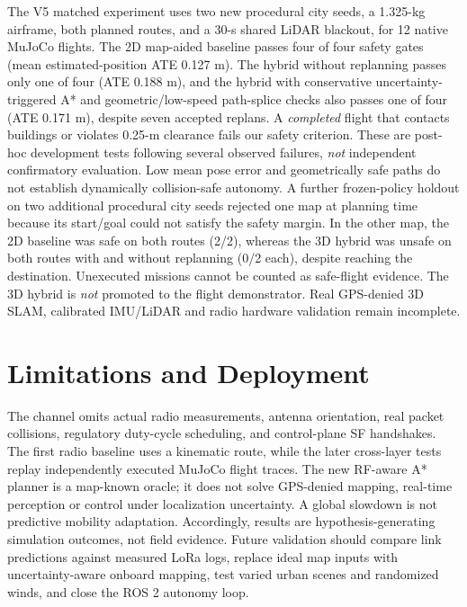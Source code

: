 \documentclass[conference]{IEEEtran}
\begin{document}
The V5 matched experiment uses two new procedural city seeds, a 1.325-kg airframe, both planned routes, and a 30-s shared LiDAR blackout, for 12 native MuJoCo flights. The 2D map-aided baseline passes four of four safety gates (mean estimated-position ATE 0.127 m). The hybrid without replanning passes only one of four (ATE 0.188 m), and the hybrid with conservative uncertainty-triggered A* and geometric/low-speed path-splice checks also passes one of four (ATE 0.171 m), despite seven accepted replans. A \emph{completed} flight that contacts buildings or violates 0.25-m clearance fails our safety criterion. These are post-hoc development tests following several observed failures, \emph{not} independent confirmatory evaluation. Low mean pose error and geometrically safe paths do not establish dynamically collision-safe autonomy. A further frozen-policy holdout on two additional procedural city seeds rejected one map at planning time because its start/goal could not satisfy the safety margin. In the other map, the 2D baseline was safe on both routes (2/2), whereas the 3D hybrid was unsafe on both routes with and without replanning (0/2 each), despite reaching the destination. Unexecuted missions cannot be counted as safe-flight evidence. The 3D hybrid is \emph{not} promoted to the flight demonstrator. Real GPS-denied 3D SLAM, calibrated IMU/LiDAR and radio hardware validation remain incomplete.

\section{Limitations and Deployment}
The channel omits actual radio measurements, antenna orientation, real packet collisions, regulatory duty-cycle scheduling, and control-plane SF handshakes. The first radio baseline uses a kinematic route, while the later cross-layer tests replay independently executed MuJoCo flight traces. The new RF-aware A* planner is a map-known oracle; it does not solve GPS-denied mapping, real-time perception or control under localization uncertainty. A global slowdown is not predictive mobility adaptation. Accordingly, results are hypothesis-generating simulation outcomes, not field evidence. Future validation should compare link predictions against measured LoRa logs, replace ideal map inputs with uncertainty-aware onboard mapping, test varied urban scenes and randomized winds, and close the ROS 2 autonomy loop.
\end{document}

